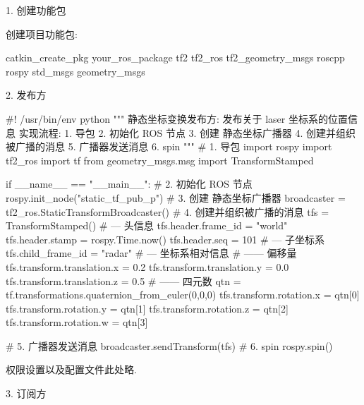 \documentclass[openany, fontset=windowsold]{ctexbook}
\theoremstyle{kaiti}
\theoremstyle{normal}
\begin{document}
1. 创建功能包

创建项目功能包:

\begin{bash}
  catkin_create_pkg your_ros_package tf2 tf2_ros tf2_geometry_msgs roscpp rospy std_msgs geometry_msgs
\end{bash}

2. 发布方

\begin{python}
  #! /usr/bin/env python
  """  
      静态坐标变换发布方:
          发布关于 laser 坐标系的位置信息 
      实现流程:
          1. 导包
          2. 初始化 ROS 节点
          3. 创建 静态坐标广播器
          4. 创建并组织被广播的消息
          5. 广播器发送消息
          6. spin
  """
  # 1. 导包
  import rospy
  import tf2_ros
  import tf
  from geometry_msgs.msg import TransformStamped

  if __name__ == "__main__":
      # 2. 初始化 ROS 节点
      rospy.init_node("static_tf_pub_p")
      # 3. 创建 静态坐标广播器
      broadcaster = tf2_ros.StaticTransformBroadcaster()
      # 4. 创建并组织被广播的消息
      tfs = TransformStamped()
      # --- 头信息
      tfs.header.frame_id = "world"
      tfs.header.stamp = rospy.Time.now()
      tfs.header.seq = 101
      # --- 子坐标系
      tfs.child_frame_id = "radar"
      # --- 坐标系相对信息
      # ------ 偏移量
      tfs.transform.translation.x = 0.2
      tfs.transform.translation.y = 0.0
      tfs.transform.translation.z = 0.5
      # ------ 四元数
      qtn = tf.transformations.quaternion_from_euler(0,0,0)
      tfs.transform.rotation.x = qtn[0]
      tfs.transform.rotation.y = qtn[1]
      tfs.transform.rotation.z = qtn[2]
      tfs.transform.rotation.w = qtn[3]

      # 5. 广播器发送消息
      broadcaster.sendTransform(tfs)
      # 6. spin
      rospy.spin()
\end{python}

权限设置以及配置文件此处略.

3. 订阅方
\end{document}
